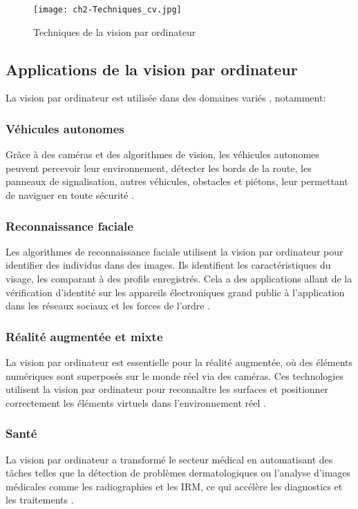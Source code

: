 \begin{figure}[H]
	\centering
	\texttt{[image: ch2-Techniques\_cv.jpg]}
	\caption{Techniques de la vision par ordinateur \cite{simplilearn2023computer}}
    \label{fig:ch2-Techniques_cv}
\end{figure}

\subsection{Applications de la vision par ordinateur }

La vision par ordinateur est utilisée dans des domaines variés \cite{simplilearn2023computer}, notamment:

\subsubsection{ Véhicules autonomes }
Grâce à des caméras et des algorithmes de vision, les véhicules autonomes peuvent percevoir leur environnement, détecter les bords de la route, les panneaux de signalisation, autres véhicules, obstacles et piétons, leur permettant de naviguer en toute sécurité \cite{simplilearn2023computer}.

\subsubsection{Reconnaissance faciale }
Les algorithmes de reconnaissance faciale utilisent la vision par ordinateur pour identifier des individus dans des images. Ils identifient les caractéristiques du visage, les comparant à des profils enregistrés. Cela a des applications allant de la vérification d'identité sur les appareils électroniques grand public à l'application dans les réseaux sociaux et les forces de l'ordre \cite{simplilearn2023computer}.

\subsubsection{Réalité augmentée et mixte }
La vision par ordinateur est essentielle pour la réalité augmentée, où des éléments numériques sont superposés sur le monde réel via des caméras. Ces technologies utilisent la vision par ordinateur pour reconnaître les surfaces et positionner correctement les éléments virtuels dans l'environnement réel \cite{simplilearn2023computer}.

\subsubsection{Santé }
La vision par ordinateur a transformé le secteur médical en automatisant des tâches telles que la détection de problèmes dermatologiques ou l'analyse d'images médicales comme les radiographies et les IRM, ce qui accélère les diagnostics et les traitements \cite{simplilearn2023computer}.

